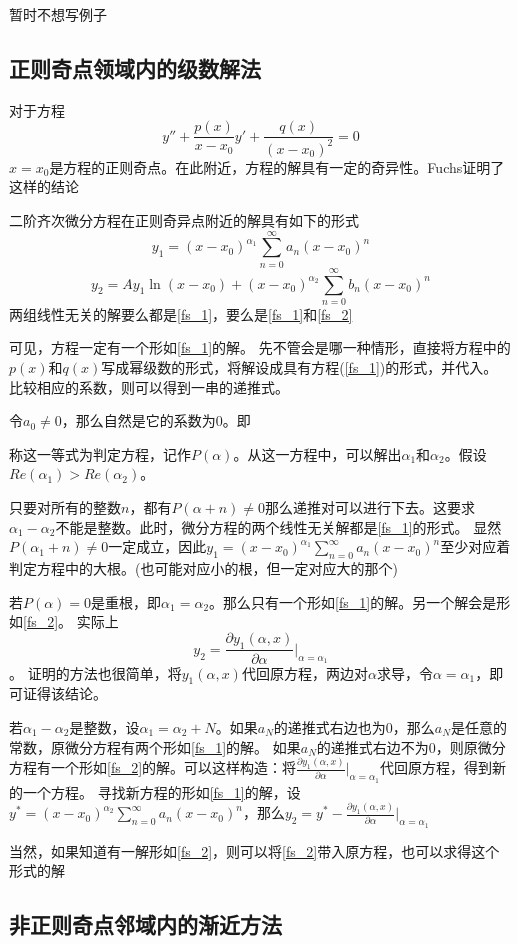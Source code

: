 \begin{example}
   暂时不想写例子 
\end{example}

\subsection{正则奇点领域内的级数解法}
对于方程
$$y''+\frac{p(x)}{x-x_0}y'+\frac{q(x)}{(x-x_0)^2}=0$$
$x=x_0$是方程的正则奇点。在此附近，方程的解具有一定的奇异性。Fuchs证明了这样的结论
\begin{theorem}
    二阶齐次微分方程在正则奇异点附近的解具有如下的形式
    \begin{equation}\label{fs_1}
        y_1=(x-x_0)^{\alpha_1}\sum_{n=0}^{\infty}a_n(x-x_0)^n
    \end{equation}
    \begin{equation}\label{fs_2}
        y_2=Ay_1\ln{(x-x_0)}+(x-x_0)^{\alpha_2}\sum_{n=0}^{\infty}b_n(x-x_0)^n
    \end{equation}
    两组线性无关的解要么都是\ref*{fs_1}，要么是\ref*{fs_1}和\ref*{fs_2}
\end{theorem}
可见，方程一定有一个形如\ref*{fs_1}的解。
先不管会是哪一种情形，直接将方程中的$p(x)$和$q(x)$写成幂级数的形式，将解设成具有方程(\ref*{fs_1})的形式，并代入。
比较相应的系数，则可以得到一串的递推式。

令$a_0\neq 0$，那么自然是它的系数为0。即

称这一等式为判定方程，记作$P(\alpha)$。从这一方程中，可以解出$\alpha_1$和$\alpha_2$。假设$Re(\alpha_1)> Re(\alpha_2)$。

只要对所有的整数$n$，都有$P(\alpha+n)\neq 0$那么递推对可以进行下去。这要求$\alpha_1-\alpha_2$不能是整数。此时，微分方程的两个线性无关解都是\ref*{fs_1}的形式。
显然$P(\alpha_1+n)\neq 0$一定成立，因此$y_1=(x-x_0)^{\alpha_1}\sum_{n=0}^{\infty}a_n(x-x_0)^n$至少对应着判定方程中的大根。(也可能对应小的根，但一定对应大的那个)

若$P(\alpha)=0$是重根，即$\alpha_1=\alpha_2$。那么只有一个形如\ref*{fs_1}的解。另一个解会是形如\ref*{fs_2}。
实际上$$y_2=\frac{\partial y_1(\alpha,x)}{\partial \alpha}|_{\alpha=\alpha_1}$$。
证明的方法也很简单，将$y_1(\alpha,x)$代回原方程，两边对$\alpha$求导，令$\alpha=\alpha_1$，即可证得该结论。

若$\alpha_1-\alpha_2$是整数，设$\alpha_1=\alpha_2+N$。如果$a_N$的递推式右边也为0，那么$a_N$是任意的常数，原微分方程有两个形如\ref*{fs_1}的解。
如果$a_N$的递推式右边不为0，则原微分方程有一个形如\ref*{fs_2}的解。可以这样构造：将$\frac{\partial y_1(\alpha,x)}{\partial \alpha}|_{\alpha=\alpha_1}$代回原方程，得到新的一个方程。
寻找新方程的形如\ref*{fs_1}的解，设$ y^*=(x-x_0)^{\alpha_2}\sum_{n=0}^{\infty}a_n(x-x_0)^n$，那么$y_2=y^*-\frac{\partial y_1(\alpha,x)}{\partial \alpha}|_{\alpha=\alpha_1}$

当然，如果知道有一解形如\ref*{fs_2}，则可以将\ref*{fs_2}带入原方程，也可以求得这个形式的解

\subsection{非正则奇点邻域内的渐近方法}